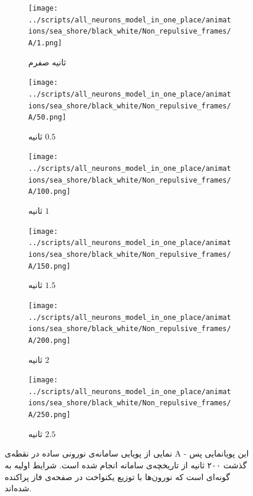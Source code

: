\begin{figure}
	\begin{subfigure}{0.5\textwidth}
		\texttt{[image: ../scripts/all\_neurons\_model\_in\_one\_place/animations/sea\_shore/black\_white/Non\_repulsive\_frames/A/1.png]}
		\caption{
			ثانیه صفرم		
		}
	\end{subfigure}
	\hfill
	\begin{subfigure}{0.5\textwidth}
		\texttt{[image: ../scripts/all\_neurons\_model\_in\_one\_place/animations/sea\_shore/black\_white/Non\_repulsive\_frames/A/50.png]}
		\caption{
			ثانیه $0.5$
		}
	\end{subfigure}
	\hfill
	\begin{subfigure}{0.5\textwidth}
		\texttt{[image: ../scripts/all\_neurons\_model\_in\_one\_place/animations/sea\_shore/black\_white/Non\_repulsive\_frames/A/100.png]}
		\caption{
			ثانیه $1$		
		}
	\end{subfigure}
	\hfill
	\begin{subfigure}{0.5\textwidth}
		\texttt{[image: ../scripts/all\_neurons\_model\_in\_one\_place/animations/sea\_shore/black\_white/Non\_repulsive\_frames/A/150.png]}
		\caption{
			ثانیه $1.5$
		}
	\end{subfigure}
	\hfill
	\begin{subfigure}{0.5\textwidth}
		\texttt{[image: ../scripts/all\_neurons\_model\_in\_one\_place/animations/sea\_shore/black\_white/Non\_repulsive\_frames/A/200.png]}
		\caption{
			ثانیه $2$
		}
	\end{subfigure}
	\hfill
	\begin{subfigure}{0.5\textwidth}
		\texttt{[image: ../scripts/all\_neurons\_model\_in\_one\_place/animations/sea\_shore/black\_white/Non\_repulsive\_frames/A/250.png]}
		\caption{
			ثانیه $2.5$
		}
	\end{subfigure}
	\hfill
	\caption{
		نمایی از پویایی سامانه‌ی نورونی ساده در نقطه‌ی A - این پویانمایی پس گذشت ۲۰۰ ثانیه از تاریخچه‌ی سامانه انجام شده است. شرایط اولیه به گونه‌ای است که نورون‌ها با توزیع یکنواخت در صفحه‌ی فاز پراکنده شده‌اند.	
	}
	\label{fig:simple_animation_A}
\end{figure}















